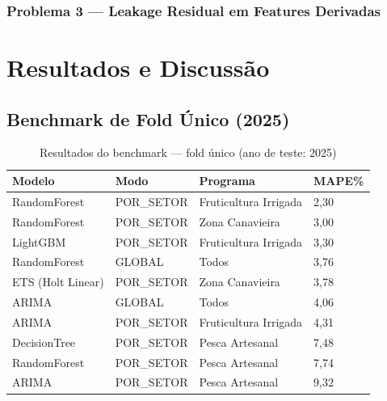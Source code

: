 \documentclass[12pt, a4paper]{article}
\begin{document}
\subsubsection{Problema 3 — Leakage Residual em Features Derivadas}

\newpage
\section{Resultados e Discussão}
\label{sec:resultados}

\subsection{Benchmark de Fold Único (2025)}


\begin{table}[H]
  \centering
  \caption{Resultados do benchmark — fold único (ano de teste: 2025)}
  \label{tab:resultados_benchmark}
  \begin{tabular}{llll}
    \toprule
    \textbf{Modelo}       & \textbf{Modo}    & \textbf{Programa}          & \textbf{MAPE\%} \\
    \midrule
    RandomForest          & POR\_SETOR       & Fruticultura Irrigada      & 2,30  \\
    RandomForest          & POR\_SETOR       & Zona Canavieira            & 3,00  \\
    LightGBM              & POR\_SETOR       & Fruticultura Irrigada      & 3,30  \\
    RandomForest          & GLOBAL           & Todos                      & 3,76  \\
    ETS (Holt Linear)     & POR\_SETOR       & Zona Canavieira            & 3,78  \\
    ARIMA                 & GLOBAL           & Todos                      & 4,06  \\
    ARIMA                 & POR\_SETOR       & Fruticultura Irrigada      & 4,31  \\
    DecisionTree          & POR\_SETOR       & Pesca Artesanal            & 7,48  \\
    RandomForest          & POR\_SETOR       & Pesca Artesanal            & 7,74  \\
    ARIMA                 & POR\_SETOR       & Pesca Artesanal            & 9,32  \\
    \bottomrule
  \end{tabular}
\end{table}
\end{document}
